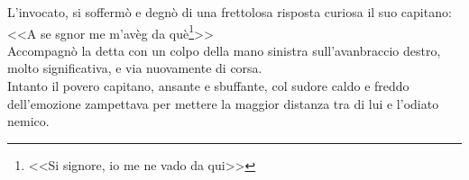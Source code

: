 \indent L'invocato, si soffermò e degnò di una frettolosa risposta curiosa il suo capitano: <<A se sgnor me m'avèg da què\footnote{<<Si signore, io me ne vado da qui>>}>>\\
\indent Accompagnò la detta con un colpo della mano sinistra sull'avanbraccio destro, molto significativa, e via nuovamente di corsa.\\
\indent Intanto il povero capitano, ansante e sbuffante, col sudore caldo e freddo dell'emozione zampettava per mettere la maggior distanza tra di lui e l'odiato nemico.\\